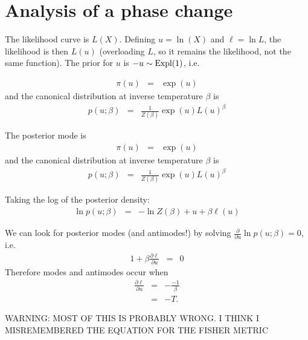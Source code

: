 \documentclass[a4paper, 11pt]{article}
\title{}
\author{}
\begin{document}
\maketitle



\section{Analysis of a phase change}
The likelihood curve is $L(X)$. Defining $u = \ln(X)$ and $\ell = \ln L$, the likelihood is
then $L(u)$ (overloading $L$, so it remains the likelihood, not the same
function). The prior for $u$ is $-u \sim \textnormal{Expl}(1)$, i.e.

\begin{eqnarray}
\pi(u) &=& \exp(u)
\end{eqnarray}
and the canonical distribution at inverse temperature $\beta$ is
\begin{eqnarray}
p(u; \beta) &=& \frac{1}{Z(\beta)}\exp(u)L(u)^\beta
\end{eqnarray}

The posterior mode is
\begin{eqnarray}
\pi(u) &=& \exp(u)
\end{eqnarray}
and the canonical distribution at inverse temperature $\beta$ is
\begin{eqnarray}
p(u; \beta) &=& \frac{1}{Z(\beta)}\exp(u)L(u)^\beta
\end{eqnarray}

Taking the log of the posterior density:
\begin{eqnarray}
\ln p(u; \beta) &=& -\ln Z(\beta) + u + \beta \ell(u)
\end{eqnarray}

We can look for posterior modes (and antimodes!) by solving
$\frac{\partial}{\partial u} \ln p(u; \beta) = 0$, i.e.
\begin{eqnarray}
1 + \beta \frac{\partial \ell}{\partial u} &=& 0
\end{eqnarray}
Therefore modes and antimodes occur when
\begin{eqnarray}
\frac{\partial \ell}{\partial u} &=& -\frac{-1}{\beta}\\
&=& -T.
\end{eqnarray}





\newpage

WARNING: MOST OF THIS IS PROBABLY WRONG. I THINK I MISREMEMBERED THE
EQUATION FOR THE FISHER METRIC
\end{document}
